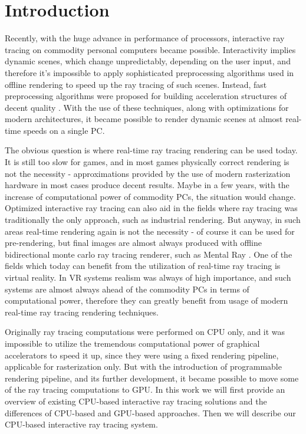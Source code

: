 \documentclass{article}
\begin{document}
\newpage
\section{Introduction}
Recently, with the huge advance in performance of processors, interactive ray tracing on commodity personal computers became possible. Interactivity implies dynamic scenes, which change unpredictably, depending on the user input, and therefore it's impossible to apply sophisticated preprocessing algorithms used in offline rendering to speed up the ray tracing of such scenes. Instead, fast preprocessing algorithms were proposed for building acceleration structures of decent quality \cite{wald04}. With the use of these techniques, along with optimizations for modern architectures, it became possible to render dynamic scenes at almost real-time speeds on a single PC.

The obvious question is where real-time ray tracing rendering can be used today. It is still too slow for games, and in most games physically correct rendering is not the necessity - approximations provided by the use of modern rasterization hardware in most cases produce decent results. Maybe in a few years, with the increase of computational power of commodity PCs, the situation would change. Optimized interactive ray tracing can also aid in the fields where ray tracing was traditionally the only approach, such as industrial rendering. But anyway, in such areas real-time rendering again is not the necessity - of course it can be used for pre-rendering, but final images are almost always produced with offline bidirectional monte carlo ray tracing renderer, such as Mental Ray \cite{mentalray}. One of the fields which today can benefit from the utilization of real-time ray tracing is virtual reality. In VR systems realism was always of high importance, and such systems are almost always ahead of the commodity PCs in terms of computational power, therefore they can greatly benefit from usage of modern real-time ray tracing rendering techniques.

Originally ray tracing computations were performed on CPU only, and it was impossible to utilize the tremendous computational power of graphical accelerators to speed it up, since they were using a fixed rendering pipeline, applicable for rasterization only. But with the introduction of programmable rendering pipeline, and its further development, it became possible to move some of the ray tracing computations to GPU. In this work we will first provide an overview of existing CPU-based interactive ray tracing solutions and the differences of CPU-based and GPU-based approaches. Then we will describe our CPU-based interactive ray tracing system.
\end{document}
